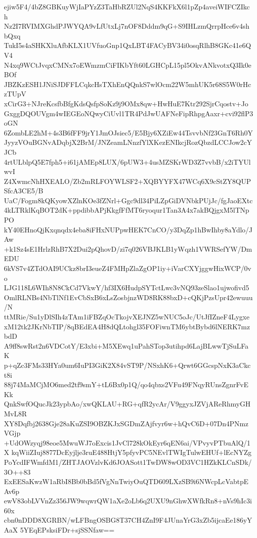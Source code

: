 ejiw5F4/4bZ8GBKuyWjIaPYzZ3TaHbRZUl2NqS4KKFkX6l1pZp4aveiWIFCZIkch
Nz2I7RVIMXGhdPJWYQA9vLfUtxLj7nOF8Dddm9qG+S9IHLzmQrrpHce6v4shbQxq
TukI5s4aSHKXluAfbKLX1UVfuoGnp1QxLBT4FACyBV34i0osqRlhB8GKc41e6QV4
N4xq9WCtJvqxCMNx7oEWmzmCiFIKbYft60LGHCpL15pl5OkvANkvotxQ3Ik0eBOf
JBZKzESH1JNiSJDFFLCqkcHsTXhEnQQnkS7wlOcm22W5mhUK5r68S5W0rHczTUpV
xCirG3+NJreKcsfbBfgKdsQsfpSoKz9j9OMx8qw+HwHuE7Ktr292SjrCqostv+Jo
GxggDQOUVgm4wIEGEoNQwyCiUvl1TR4PdJwUAFNeFipRhpgAaxr+cvi92flP3oGN
6ZombLE2hM+4s3B6fFF9jrY1JmOJsiec5/E5Bjy6XZiEw44TsvvbNf23GnT6Rh0Y
JyyzVOuBGNvADqbjX2BrM/JNZeamLNnzfYlXKezENIkcjRozQbzdLCCJow2cYJCb
4rtULblpQ5E7fph5+i61jAMEp8LUX/6pUW3+4usMZSKrWD3Z7vvbB/x2iTYUlwvI
Z4XwmcNhHXEALO/Zb2mRLFOYWLSF2+XQBYYFX47WCq6X9cStZY8QUPSfcA3CE5/B
UaC/Fogm8kQKyowXZlnKOe3fZNrl+Ggc9dl34PiLZpGiDVNbkPUjJc/fgJaoEXtc
4kLTRklKqBOT2dK+ppdibbAPjKkgfFfMT6ryoqur1Tan3A4x7akBQjgxM5lTNpPO
kY40EHnoQjKxqnqdx4eba8iFHxNUPpwHEK7CnCO/y3DqZp1hBwIhby8aYdlo/JAw
+k1Sz4sE1HrlzRhB7X2Dui2pQhovD/zi7q026VBJKLB1yWqzh1VWRSefYW/DmEDU
6kVS7v4ZTdOAI9UCkz8brI3eueZ4FMHpZlaZgOP1iy+iVarCXYjggwHixWCP/0vo
LJG118L6WIh8N8CkCd7VkwY/hf3IX6HudpSYTctLwc3vNQ93zeSlao1ujwofivd5
OmlRLNBs4NbTlNf1EvCbSxB6xLsZosbjnzWD8RK88bxD+cQKjPzsUpr42ewuuu/N
ttMRie/Su1yDlSIh4zTAm1iFBZqOcTkojvXEJNZ5wNUC5oJc/UtJfIZneF4Lygxe
xM12tk2JKrNbTIP/8qBEdEA4H8dQLtohgl35FOFiwnTM6ybtBybd6lNERK7mzbdD
A9ff8swRst2n6VDCotY/E3xbi+M5XEwq1uPahSTop3utihpd6LajBLwwTjSuLFaK
p+qZc3FMs33HYa0um6IuPI3GiK2X84vST9P/NSxhK6+Qrwt6GGcspNxK3aCkct8i
88j74MaMCjMO6med2tf9smY+tL6Bx0p1Q/qo4qbxs2VFu49FNqyRUnsZgnrFvEKk
QnkSwfOQucJk23ypbAo/xwQKLAU+RG+qfR2ycAr/V9ggyxJZVjAReRhmyGHMvL8R
XY8Dqfbj2638Gje28aKuZSI9OBZKJxSGDmZAjfvyr6w+hQvC6D+07Dn4PNmzVGjp
+UdOWzyqj98eoe5MwuWJ7oExcis1JvCl728kOkEyr6qEN6ai/VPvyvPTbuAlQ/1X
kqWiiZIuj8877DcEyjlje3ruE488HtjY5pfyvPC5NEvlTWIgTulwEHUf+lEcNYZg
PoYcdIFWmfdM1/ZHTJAOVzlvKd6JOASott1TwDW8wOD3VC1HZkKLCnSDk/3O++83
ExEESaKwzW1aRbI8Bb0bBd5fVgNnTwiyOuQTD609LXzSB9i6NWcpLcVabtpEAv6p
ewV83obLVVnZz356JW9wqwrQW1aXe2oLb6q2UXU9nGhwXWfkRn8+nVs9hIc3i60x
cbn0nDDD8XGRBN/wLFBngOSBG8T37CH4ZnI9F4JUnaYrG3xZb5ijcaEe186yYAaX
5YEqEPsksiFDr+sjSSNfaw==
